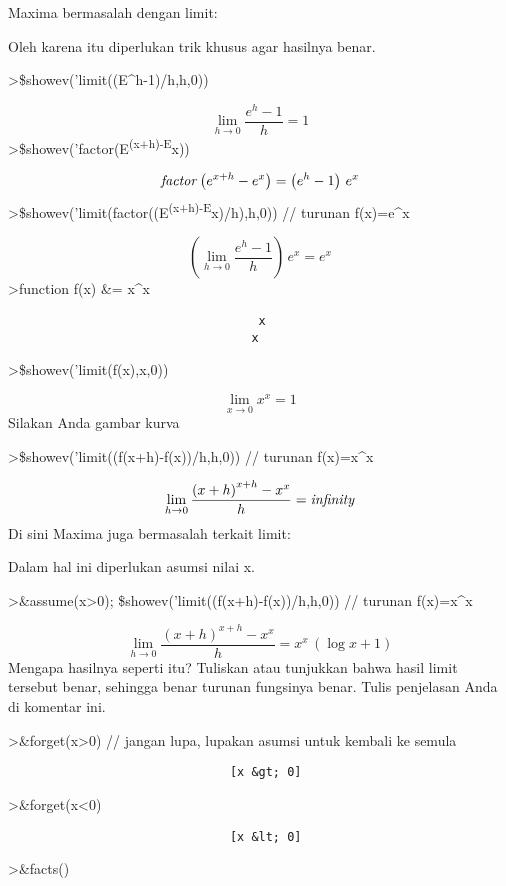 \documentclass[
]{book}
\begin{document}
Maxima bermasalah dengan limit:

Oleh karena itu diperlukan trik khusus agar hasilnya benar.

\textgreater\$showev('limit((E\^{}h-1)/h,h,0))

\[\lim_{h\rightarrow 0}{\frac{e^{h}-1}{h}}=1\]\textgreater\$showev('factor(E\textsuperscript{(x+h)-E}x))

\[{\it factor}\left(e^{x+h}-e^{x}\right)=\left(e^{h}-1\right)\,e^{x}\]\textgreater\$showev('limit(factor((E\textsuperscript{(x+h)-E}x)/h),h,0)) // turunan f(x)=e\^{}x

\[\left(\lim_{h\rightarrow 0}{\frac{e^{h}-1}{h}}\right)\,e^{x}=e^{x}\]\textgreater function f(x) \&= x\^{}x

\begin{verbatim}
                                   x
                                  x
\end{verbatim}

\textgreater\$showev('limit(f(x),x,0))

\[\lim_{x\rightarrow 0}{x^{x}}=1\]Silakan Anda gambar kurva

\textgreater\$showev('limit((f(x+h)-f(x))/h,h,0)) // turunan f(x)=x\^{}x

\[\lim_{h\rightarrow 0}{\frac{\left(x+h\right)^{x+h}-x^{x}}{h}}=  {\it infinity}\]Di sini Maxima juga bermasalah terkait limit:

Dalam hal ini diperlukan asumsi nilai x.

\textgreater\&assume(x\textgreater0); \$showev('limit((f(x+h)-f(x))/h,h,0)) // turunan f(x)=x\^{}x

\[\lim_{h\rightarrow 0}{\frac{\left(x+h\right)^{x+h}-x^{x}}{h}}=x^{x}  \,\left(\log x+1\right)\]Mengapa hasilnya seperti itu? Tuliskan atau tunjukkan bahwa hasil limit tersebut benar, sehingga benar turunan fungsinya benar. Tulis penjelasan Anda di komentar ini.

\textgreater\&forget(x\textgreater0) // jangan lupa, lupakan asumsi untuk kembali ke semula

\begin{verbatim}
                               [x &gt; 0]
\end{verbatim}

\textgreater\&forget(x\textless0)

\begin{verbatim}
                               [x &lt; 0]
\end{verbatim}

\textgreater\&facts()
\end{document}
